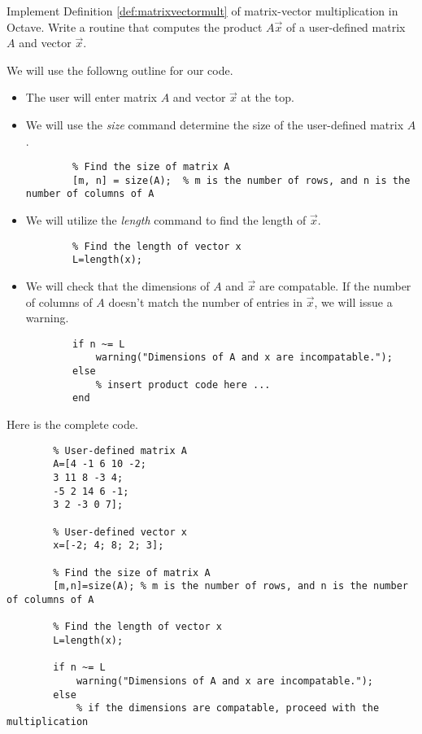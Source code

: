 \documentclass{ximera}
\begin{document}
    \begin{example}\label{ex:oct_mat_prod_def}
        Implement Definition \ref{def:matrixvectormult} of matrix-vector multiplication in Octave.  Write a routine that computes the product $A\vec{x}$ of a user-defined matrix $A$ and vector $\vec{x}$.

    \begin{explanation}
    We will use the followng outline for our code.
    \begin{itemize}
    \item The user will enter matrix $A$ and vector $\vec{x}$ at the top.    
    \item We will use the \emph{size} command determine the size of the user-defined matrix $A$.  
    \begin{verbatim}
        % Find the size of matrix A
        [m, n] = size(A);  % m is the number of rows, and n is the number of columns of A
    \end{verbatim}
    \item We will utilize the \emph{length} command to find the length of $\vec{x}$.
    \begin{verbatim}
        % Find the length of vector x
        L=length(x);
    \end{verbatim}
    \item We will check that the dimensions of $A$ and $\vec{x}$ are compatable.  If the number of columns of $A$ doesn't match the number of entries in $\vec{x}$, we will issue a warning. 
    \begin{verbatim}
        if n ~= L  
            warning("Dimensions of A and x are incompatable.");  
        else  
            % insert product code here ... 
        end    
    \end{verbatim}
\end{itemize}

    Here is the complete code.

    \begin{verbatim}
        % User-defined matrix A
        A=[4 -1 6 10 -2;
        3 11 8 -3 4;
        -5 2 14 6 -1;
        3 2 -3 0 7];

        % User-defined vector x
        x=[-2; 4; 8; 2; 3];

        % Find the size of matrix A
        [m,n]=size(A); % m is the number of rows, and n is the number of columns of A

        % Find the length of vector x
        L=length(x);

        if n ~= L
            warning("Dimensions of A and x are incompatable.");
        else
            % if the dimensions are compatable, proceed with the multiplication


\end{verbatim}
\end{explanation}
\end{example}
\end{document}
